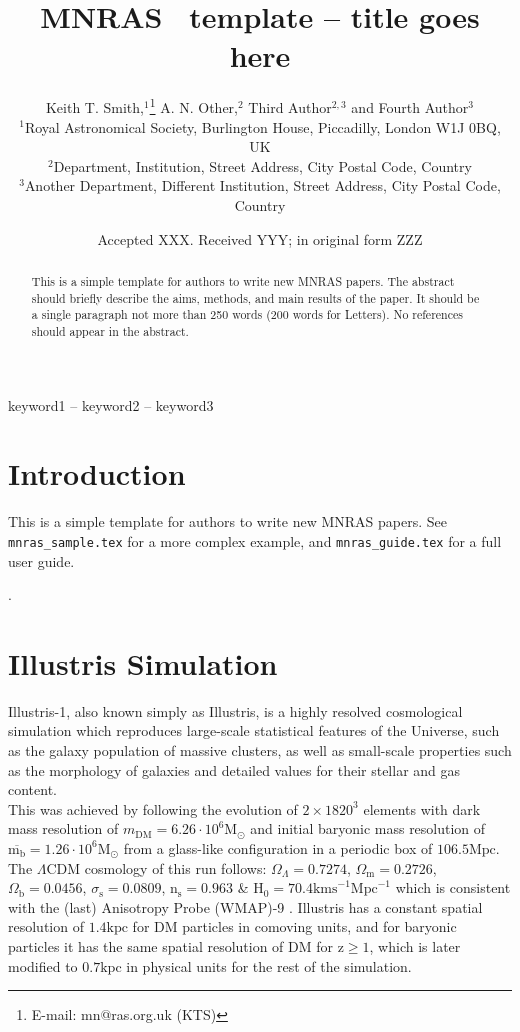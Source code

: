 \documentclass[a4paper,fleqn,usenatbib]{mnras}
\title[Short title, max. 45 characters]{MNRAS \LaTeXe\ template -- title goes here}
\author[K. T. Smith et al.]{
Keith T. Smith,$^{1}$\thanks{E-mail: mn@ras.org.uk (KTS)}
A. N. Other,$^{2}$
Third Author$^{2,3}$
and Fourth Author$^{3}$
\\
$^{1}$Royal Astronomical Society, Burlington House, Piccadilly, London W1J 0BQ, UK\\
$^{2}$Department, Institution, Street Address, City Postal Code, Country\\
$^{3}$Another Department, Different Institution, Street Address, City Postal Code, Country
}
\date{Accepted XXX. Received YYY; in original form ZZZ}
\begin{document}
\label{firstpage}
\pagerange{\pageref{firstpage}--\pageref{lastpage}}
\maketitle

\begin{abstract}
This is a simple template for authors to write new MNRAS papers.
The abstract should briefly describe the aims, methods, and main results of the paper.
It should be a single paragraph not more than 250 words (200 words for Letters).
No references should appear in the abstract.
\end{abstract}

\begin{keywords}
keyword1 -- keyword2 -- keyword3
\end{keywords}



\section{Introduction}

This is a simple template for authors to write new MNRAS papers.
See \texttt{mnras\_sample.tex} for a more complex example, and \texttt{mnras\_guide.tex}
for a full user guide.

\cite{Tweb}.

\section{Illustris Simulation}
Illustris-1, also known simply as Illustris, is a highly resolved
cosmological simulation which reproduces large-scale statistical
features of the Universe, such as the galaxy population of massive
clusters, as well as small-scale properties such as the morphology of
galaxies and detailed values for their stellar and gas content.\\ 

This was achieved by following the evolution of $2 \times 1820^3$ elements with dark mass resolution of $m_{\text{DM}} = 6.26\cdot 10^6\text{M}_{\odot}$ and initial baryonic mass resolution of $\overline{\text{m}_\text{b}}=1.26\cdot 10^6\text{M}_{\odot}$ from a glass-like configuration in a periodic box of $106.5\text{Mpc}$. The $\Lambda \text{CDM}$ cosmology of this run follows: $\Omega_\Lambda=0.7274$, $\Omega_\text{m}=0.2726$, $\Omega_\text{b}=0.0456$, $\sigma_\text{s}=0.0809$, $\text{n}_\text{s}=0.963$ \& $\text{H}_0=70.4\text{kms}
^{-1}\text{Mpc}^{-1}$ which is consistent with the (last) Anisotropy
Probe (WMAP)-9 \cite{AnisotropyProbe}. Illustris has a constant
spatial resolution of $1.4\text{kpc}$ for DM particles in comoving
units, and for baryonic particles it has the same spatial resolution
of DM for $\text{z}\geq 1$, which is later modified to $0.7\text{kpc}$
in physical units for the rest of the simulation. \\ 
\end{document}
